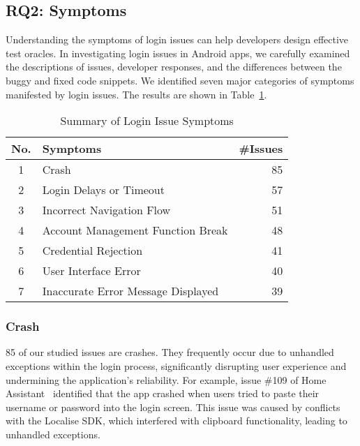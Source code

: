 \subsection{RQ2: Symptoms}
Understanding the symptoms of login issues can help developers design effective test oracles.
In investigating login issues in Android apps, we carefully examined the descriptions of issues, developer responses, and the differences between the buggy and fixed code snippets. We identified seven major categories of symptoms manifested by login issues. The results are shown in Table~\ref{tab:symptoms}.

\begin{table}
  \centering
  \caption{Summary of Login Issue Symptoms}
  \label{tab:symptoms}
  \begin{tabular}{@{}c l r@{}} %
    \toprule
    \textbf{No.} & \textbf{Symptoms} & \textbf{\#Issues} \\ 
    \midrule
    1 & Crash & 85 \\
    2 & Login Delays or Timeout & 57 \\
    3 & Incorrect Navigation Flow & 51 \\
    4 & Account Management Function Break & 48 \\
    5 & Credential Rejection & 41\\
    6 & User Interface Error & 40\\
    7 & Inaccurate Error Message Displayed & 39 \\
    \bottomrule
  \end{tabular}
\end{table}

\subsubsection{Crash}
85 of our studied issues are crashes. They frequently occur due to unhandled exceptions within the login process, significantly disrupting user experience and undermining the application's reliability. For example, issue \#109 of Home Assistant~\cite{home-assistant-android} identified that the app crashed when users tried to paste their username or password into the login screen. This issue was caused by conflicts with the Localise SDK, which interfered with clipboard functionality, leading to unhandled exceptions.

